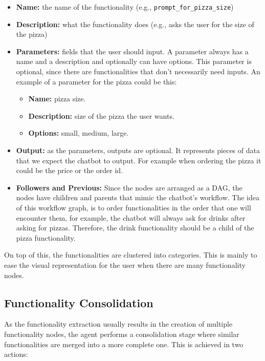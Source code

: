 \begin{itemize}
  \item \textbf{Name:} the name of the functionality (e.g., \texttt{prompt\_for\_pizza\_size})
  \item \textbf{Description:} what the functionality does (e.g., asks the user for the size of the pizza)
  \item \textbf{Parameters:} fields that the user should input.
    A parameter always has a name and a description
    and optionally can have options.
    This parameter is optional,
    since there are functionalities that don't necessarily need inputs.
    An example of a parameter for the pizza could be this:
    \begin{itemize}
      \item \textbf{Name:} pizza size.
      \item \textbf{Description:} size of the pizza the user wants.
      \item \textbf{Options:} small, medium, large.
    \end{itemize}
  \item \textbf{Output:} as the parameters, outputs are optional.
    It represents pieces of data that we expect the chatbot to output.
    For example when ordering the pizza it could be the price or the order id.
  \item \textbf{Followers and Previous:}
    Since the nodes are arranged as a \ac{DAG},
    the nodes have children and parents that mimic the chatbot's workflow.
    The idea of this workflow graph,
    is to order functionalities in the order that one will encounter them,
    for example,
    the chatbot will always ask for drinks after asking for pizzas.
    Therefore, the drink functionality should be a child of the pizza functionality.
\end{itemize}

On top of this,
the functionalities are clustered into categories.
This is mainly to ease the visual representation for the user
when there are many functionality nodes.

\subsection{Functionality Consolidation}\label{subsec:functionality-consolidation}


As the functionality extraction usually results
in the creation of multiple functionality nodes,
the agent performs a consolidation stage where
similar functionalities are merged into a more complete one.
This is achieved in two actions:

